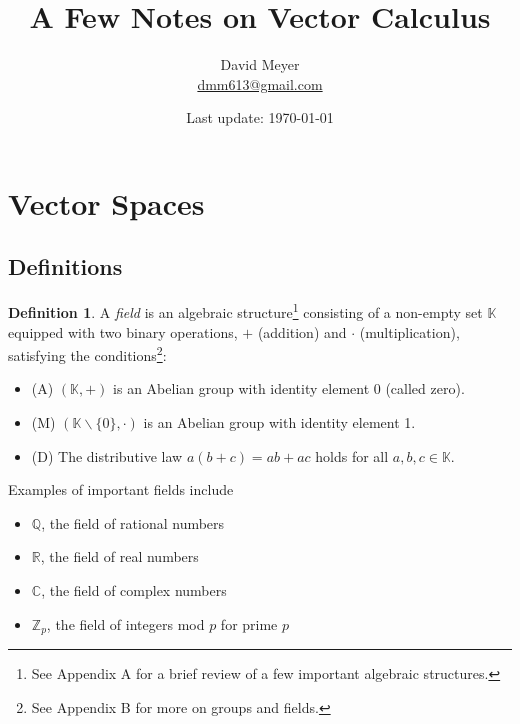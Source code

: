 \documentclass{article}
\title{A Few Notes on Vector Calculus }
\author{David Meyer \\ \href{mailto:dmm613@gmail.com}
                            {dmm613@gmail.com}}
\date{Last update: \today}
\theoremstyle{definition}
\newtheorem{definition}{Definition}[section]
\begin{document}
\maketitle
%
%
%
\section{Vector Spaces}
\subsection{Definitions}

\begin{definition}A \emph{field} is an algebraic structure\footnote{See Appendix A
for a brief review of a few important algebraic structures.} consisting 
of a non-empty set $\mathbb{K}$ equipped with two binary operations, $+$ 
(addition) and $\cdot$ (multiplication), satisfying the conditions\footnote{See 
Appendix B for more on groups and fields.}:

\medskip
\begin{itemize}
\item [] (A) $(\mathbb{K},+)$ is an Abelian group with identity element $0$ 
             (called zero).
\item [] (M) $(\mathbb{K} \backslash \{0\}, \cdot)$ is an Abelian group with 
             identity element 1.
\item [] (D) The distributive law $a(b+c)=ab+ac$ holds for all $a,b,c \in \mathbb{K}$.
\end{itemize}

\medskip
\noindent
Examples of important fields include

\medskip
\begin{itemize}
\item $\mathbb{Q}$,     the field of rational numbers
\item $\mathbb{R}$,     the field of real numbers
\item $\mathbb{C}$,     the field of complex numbers
\item $\mathbb{Z}_{p}$, the field of integers mod $p$ for prime $p$ 
\end{itemize}
\end{definition}
\end{document}
